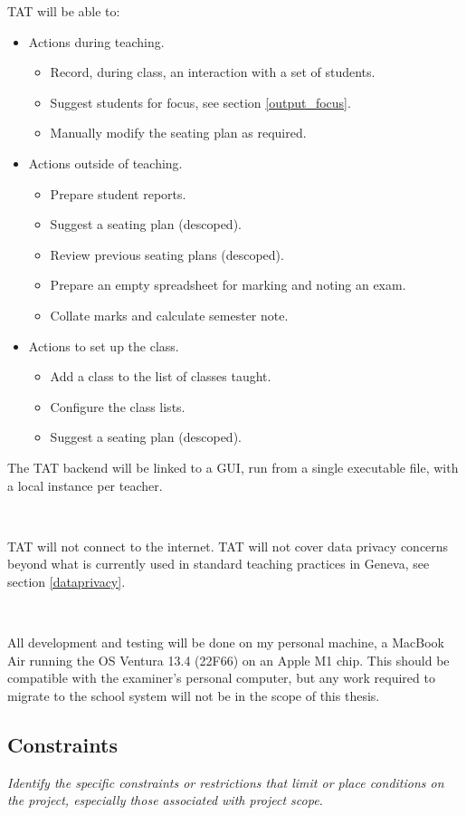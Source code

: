 \documentclass[10pt]{article}
\begin{document}
TAT will be able to:
\begin{itemize}
\item Actions during teaching.
\begin{itemize}
  \item Record, during class, an interaction with a set of students.
  \item Suggest students for focus, see section \ref{output_focus}.
  \item Manually modify the seating plan as required.
 \end{itemize}
 \item Actions outside of teaching.
 \begin{itemize}
  \item Prepare student reports.
  \item Suggest a seating plan (descoped). 
  \item Review previous seating plans (descoped).
  \item Prepare an empty spreadsheet for marking and noting an exam.
  \item Collate marks and calculate semester note.
\end{itemize}
\item Actions to set up the class.
\begin{itemize}
  \item Add a class to the list of classes taught.
  \item Configure the class lists.
  \item Suggest a seating plan (descoped).
\end{itemize}
\end{itemize}

The TAT backend will be linked to a GUI, run from a single executable file, with a local instance per teacher.

\

TAT will not connect to the internet. TAT will not cover data privacy concerns beyond what is currently used in standard teaching practices in Geneva, see section \ref{dataprivacy}.

\

All development and testing will be done on my personal machine, a MacBook Air running the OS Ventura 13.4 (22F66) on an Apple M1 chip. This should be compatible with the examiner's personal computer, but any work required to migrate to the school system will not be in the scope of this thesis.

\subsection{Constraints} 
\emph{Identify the specific constraints or restrictions that limit or place conditions on the project, especially those associated with project scope.}
\end{document}
